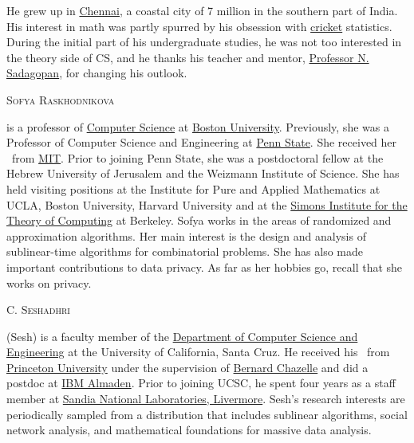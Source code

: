 \documentclass{toc}
\begin{document}
\begin{tocaboutauthors}
\begin{tocabout}[pallavoor]
\noindent   %
He grew up in \href{https://en.wikipedia.org/wiki/Chennai}{Chennai},
%
%
a coastal city of 7 million  %
in the southern part of India. %
His interest in math was partly spurred by his obsession with 
\href{https://en.wikipedia.org/wiki/Cricket}{cricket} statistics. 
During the initial part of his undergraduate studies, he was not too
interested in the theory side of CS, and he thanks
%
%
%
%
%
his teacher and mentor,   %
%
\href{http://www.iiitdm.ac.in/People/displayProfileFaculty.php?sadagopan@iiitdm.ac.in}{Professor N. Sadagopan}, for changing his outlook.
%
%
%
\end{tocabout}
\begin{tocabout}[raskhodnikova]
\hypertarget{raskhodnikovabio}{\textsc{Sofya Raskhodnikova}} 
is a professor of \href{http://www.bu.edu/cs/}{Computer Science} at \href{http://www.bu.edu/}{Boston University}. Previously, she was a Professor of Computer Science and Engineering at \href{https://www.eecs.psu.edu/}{Penn State}. She received her \phd\ from \href{http://web.mit.edu/}{MIT}. Prior to joining Penn State, she was a postdoctoral fellow at the Hebrew University of Jerusalem and the Weizmann Institute of Science. She has held visiting positions at the Institute for Pure and Applied Mathematics at UCLA, Boston University, Harvard University and at the 
\href{https://simons.berkeley.edu/}{Simons Institute for the Theory of Computing} at Berkeley. Sofya works in the areas of randomized and approximation algorithms. Her main interest is the design and analysis of sublinear-time algorithms for combinatorial problems. She has also made important contributions to data privacy.  As far as her hobbies go, recall that she works on privacy.
\end{tocabout}
\begin{tocabout}[seshadhri]
\hypertarget{seshadhribio}{\textsc{C. Seshadhri}} 
(Sesh) is a faculty member of the \href{https://www.soe.ucsc.edu/departments/computer-science-and-engineering}{Department of Computer Science and
Engineering} at the University of California, Santa Cruz. He received his
\phd\ from \href{https://www.cs.princeton.edu/}{Princeton University}
under the supervision of
\href{https://www.cs.princeton.edu/~chazelle/}{Bernard Chazelle}
and did a postdoc at
\href{https://researcher.watson.ibm.com/researcher/view_group.php?id=4207}{IBM Almaden}.
Prior to joining UCSC, he spent four years as a staff member at 
\href{https://www.sandia.gov/locations/livermore_california.html}{Sandia National Laboratories, Livermore}.
Sesh's research interests are periodically sampled from a distribution that
includes sublinear algorithms, social network analysis, and mathematical
foundations for massive data analysis.


\end{tocabout}
\end{tocaboutauthors}
\end{document}
